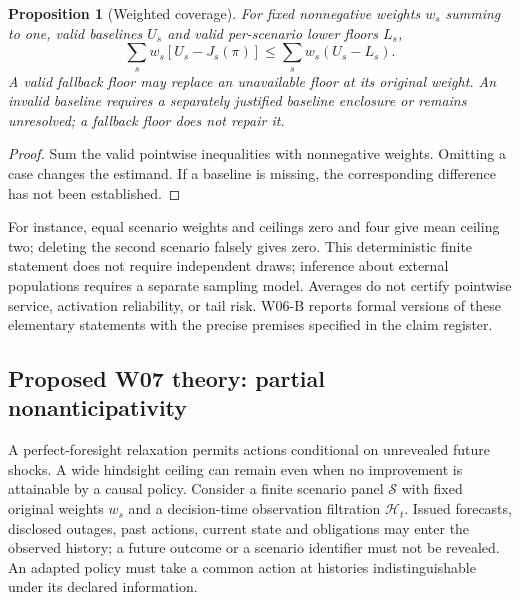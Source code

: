 \documentclass[11pt,letterpaper]{article}
\newtheorem{coaprop}[coathm]{Proposition}
\begin{document}
\begin{coaprop}[Weighted coverage]
For fixed nonnegative weights $w_s$ summing to one, valid baselines $U_s$ and valid per-scenario lower floors $L_s$,
\[
 \sum_s w_s[U_s-J_s(\pi)]\le\sum_s w_s(U_s-L_s).
\]
A valid fallback floor may replace an unavailable floor at its original weight. An invalid baseline requires a separately justified baseline enclosure or remains unresolved; a fallback floor does not repair it.
\end{coaprop}
\begin{proof}Sum the valid pointwise inequalities with nonnegative weights. Omitting a case changes the estimand. If a baseline is missing, the corresponding difference has not been established.\end{proof}
For instance, equal scenario weights and ceilings zero and four give mean ceiling two; deleting the second scenario falsely gives zero. This deterministic finite statement does not require independent draws; inference about external populations requires a separate sampling model. Averages do not certify pointwise service, activation reliability, or tail risk. W06-B reports formal versions of these elementary statements with the precise premises specified in the claim register.

\subsection{Proposed W07 theory: partial nonanticipativity}
\label{sec:coainfo}
A perfect-foresight relaxation permits actions conditional on unrevealed future shocks. A wide hindsight ceiling can remain even when no improvement is attainable by a causal policy. Consider a finite scenario panel $\mathcal S$ with fixed original weights $w_s$ and a decision-time observation filtration $\mathcal H_t$. Issued forecasts, disclosed outages, past actions, current state and obligations may enter the observed history; a future outcome or a scenario identifier must not be revealed. An adapted policy must take a common action at histories indistinguishable under its declared information.
\end{document}

